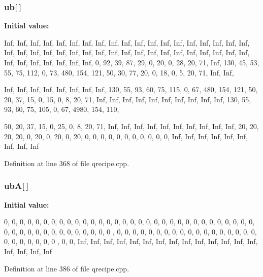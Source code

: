 \subsubsection[{ub}]{ {\bf ub}[$\,$]}\label{qrecipe_8cpp_a9bf8a6184a400ebf499706acea0a2b6f}
{\bfseries Initial value:}
\begin{DoxyCode}
 {Inf, Inf, Inf, Inf, Inf, Inf, Inf, Inf, Inf, Inf, Inf, Inf, Inf,
        Inf, Inf, Inf, Inf, Inf, Inf, Inf, Inf, Inf, Inf, Inf, Inf, Inf, Inf, 
      Inf,
        Inf, Inf, Inf, Inf, Inf, Inf, Inf, Inf, Inf, Inf, Inf, Inf, Inf, Inf, 
      Inf,
        Inf, Inf, 0, 92, 39, 87, 29, 0, 20, 0, 28, 20, 71, Inf, 130, 45, 53, 55, 
      75,
        112, 0, 73, 480, 154, 121, 50, 30, 77, 20, 0, 18, 0, 5, 20, 71, Inf, Inf,
      
        Inf, Inf, Inf, Inf, Inf, Inf, Inf, Inf, 130, 55, 93, 60, 75, 115, 0, 67,
        480, 154, 121, 50, 20, 37, 15, 0, 15, 0, 8, 20, 71, Inf, Inf, Inf, Inf, 
      Inf,
        Inf, Inf, Inf, Inf, Inf, 130, 55, 93, 60, 75, 105, 0, 67, 4980, 154, 110,
      
        50, 20, 37, 15, 0, 25, 0, 8, 20, 71, Inf, Inf, Inf, Inf, Inf, Inf, Inf, 
      Inf,
        Inf, Inf, 20, 20, 20, 20, 0, 20, 0, 20, 0, 20, 0, 0, 0, 0, 0, 0, 0, 0, 0,
       0,
        0, Inf, Inf, Inf, Inf, Inf, Inf, Inf, Inf, Inf}
\end{DoxyCode}


Definition at line 368 of file qrecipe.cpp.

\subsubsection[{ubA}]{ {\bf ubA}[$\,$]}\label{qrecipe_8cpp_ac66b94108d5993b049adc279872759f2}
{\bfseries Initial value:}
\begin{DoxyCode}
 { 0, 0, 0, 0, 0, 0, 0, 0, 0, 0, 0, 0, 0, 0, 0, 0, 0, 0, 0, 0, 0,
        0, 0, 0, 0, 0, 0, 0, 0, 0, 0, 0, 0, 0, 0, 0, 0, 0, 0, 0, 0, 0, 0, 0, 0, 0
      ,
        0, 0, 0, 0, 0, 0, 0, 0, 0, 0, 0, 0, 0, 0, 0, 0, 0, 0, 0, 0, 0, 0, 0, 0, 0
      ,
        0, 0, Inf, Inf, Inf, Inf, Inf, Inf, Inf, Inf, Inf, Inf, Inf, Inf, Inf, 
      Inf,
        Inf, Inf, Inf, Inf}
\end{DoxyCode}


Definition at line 386 of file qrecipe.cpp.

